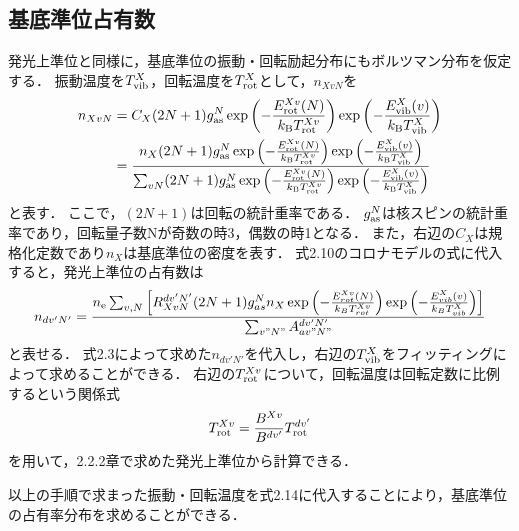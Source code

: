 \subsection{基底準位占有数}
発光上準位と同様に，基底準位の振動・回転励起分布にもボルツマン分布を仮定する．
振動温度を$T^X_{\rm vib}$，回転温度を$T^X_{\rm rot}$として，$n_{XvN}$を
\begin{equation}
\begin{split}
    n_{XvN} &= C_X (2N+1) g^N_{\rm as} \exp \left( - \frac{E^{Xv}_{\rm rot}(N)}{k_{\rm B} T^{Xv}_{\rm rot}} \right) \exp \left( - \frac{E^{X}_{\rm vib}(v)}{k_{\rm B} T^{X}_{\rm vib}} \right)\\
    &= \frac{ n_X (2N+1) g^N_{\rm as} \exp \left( - \frac{E^{Xv}_{\rm rot}(N)}{k_{\rm B} T^{Xv}_{\rm rot}} \right) \exp \left( - \frac{E^{X}_{\rm vib}(v)}{k_{\rm B} T^{X}_{\rm vib}} \right) }{\sum_{vN} (2N+1) g^N_{\rm as} \exp \left( - \frac{E^{Xv}_{\rm rot}(N)}{k_{\rm B} T^{Xv}_{\rm rot}} \right) \exp \left( - \frac{E^{X}_{\rm vib}(v)}{k_{\rm B} T^{X}_{\rm vib}} \right)}
\end{split}
\end{equation}
と表す．
ここで，$(2N+1)$は回転の統計重率である．
$g^N_{\rm as}$は核スピンの統計重率であり，回転量子数Nが奇数の時3，偶数の時1となる．
また，右辺の$C_X$は規格化定数であり$n_X$は基底準位の密度を表す．
式2.10のコロナモデルの式に代入すると，発光上準位の占有数は
\begin{equation}
    n_{dv'N'} = \frac{n_{\rm e} \sum_{v,N} \left[ R^{dv'N'}_{XvN} (2N+1)g^N_{as} n_X \exp\left(-\frac{E^{Xv}_{rot}(N)}{k_BT^{Xv}_{rot}}\right) \exp\left(-\frac{E^{X}_{vib}(v)}{k_BT^{X}_{vib}}\right) \right]}{\sum_{v"N"}A^{dv'N'}_{av"N"}}
\end{equation}
と表せる．
式2.3によって求めた$n_{dv'N'}$を代入し，右辺の$T^{X}_{\rm vib}$をフィッティングによって求めることができる．
右辺の$T^{Xv}_{\rm rot}$について，回転温度は回転定数に比例するという関係式\cite{rot-temperature-ratio}
\begin{equation}
    T^{Xv}_{\rm rot} = \frac{B^{Xv}}{B^{dv'}} T^{dv'}_{\rm rot}
\end{equation}
を用いて，2.2.2章で求めた発光上準位から計算できる．

以上の手順で求まった振動・回転温度を式2.14に代入することにより，基底準位の占有率分布を求めることができる．